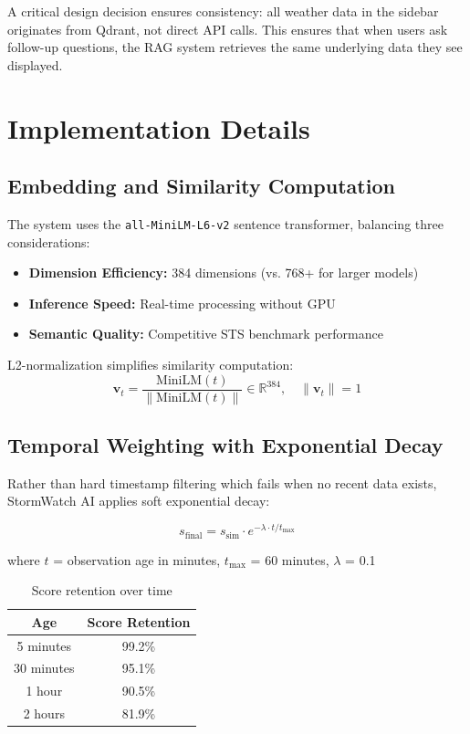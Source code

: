 \documentclass[11pt,a4paper]{article}
\begin{document}
A critical design decision ensures consistency: all weather data in the sidebar originates from Qdrant, not direct API calls. This ensures that when users ask follow-up questions, the RAG system retrieves the same underlying data they see displayed.

\newpage
\section{Implementation Details}

\subsection{Embedding and Similarity Computation}

The system uses the \texttt{all-MiniLM-L6-v2} sentence transformer, balancing three considerations:

\begin{itemize}[leftmargin=2em, itemsep=0.2em]
    \item \textbf{Dimension Efficiency:} 384 dimensions (vs. 768+ for larger models)
    \item \textbf{Inference Speed:} Real-time processing without GPU
    \item \textbf{Semantic Quality:} Competitive STS benchmark performance
\end{itemize}

L2-normalization simplifies similarity computation:
\[
\mathbf{v}_t = \frac{\text{MiniLM}(t)}{\|\text{MiniLM}(t)\|} \in \mathbb{R}^{384}, \quad \|\mathbf{v}_t\| = 1
\]

\subsection{Temporal Weighting with Exponential Decay}

Rather than hard timestamp filtering which fails when no recent data exists, StormWatch AI applies soft exponential decay:

\begin{mathbox}
\[
s_{\text{final}} = s_{\text{sim}} \cdot e^{-\lambda \cdot t / t_{\max}}
\]

\vspace{0.3em}
\small
where $t$ = observation age in minutes, $t_{\max}$ = 60 minutes, $\lambda$ = 0.1
\end{mathbox}

\begin{table}[H]
\centering
\caption{Score retention over time}
\renewcommand{\arraystretch}{1.2}
\begin{tabular}{cc}
\toprule
\textbf{Age} & \textbf{Score Retention} \\
\midrule
5 minutes & 99.2\% \\
30 minutes & 95.1\% \\
1 hour & 90.5\% \\
2 hours & 81.9\% \\
\bottomrule
\end{tabular}
\end{table}
\end{document}
